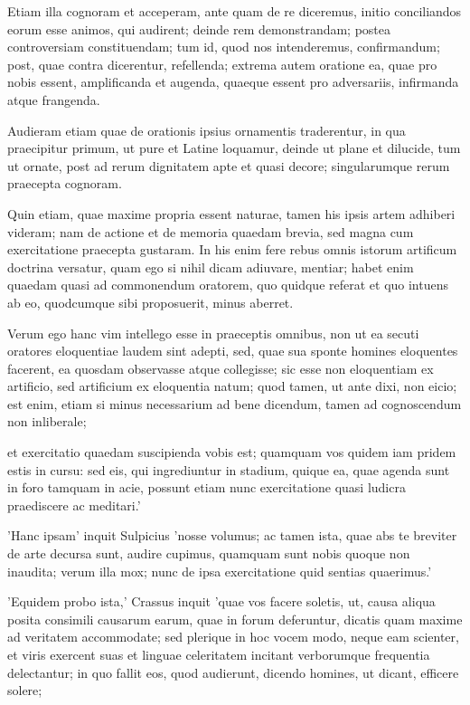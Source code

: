  Etiam illa cognoram et acceperam, ante quam de re diceremus, initio conciliandos eorum esse animos, qui audirent; deinde rem demonstrandam; postea controversiam constituendam; tum id, quod nos intenderemus, confirmandum; post, quae contra dicerentur, refellenda; extrema autem oratione ea, quae pro nobis essent, amplificanda et augenda, quaeque essent pro adversariis, infirmanda atque frangenda.

 Audieram etiam quae de orationis ipsius ornamentis traderentur, in qua praecipitur primum, ut pure et Latine loquamur, deinde ut plane et dilucide, tum ut ornate, post ad rerum dignitatem apte et quasi decore; singularumque rerum praecepta cognoram.

 Quin etiam, quae maxime propria essent naturae, tamen his ipsis artem adhiberi videram; nam de actione et de memoria quaedam brevia, sed magna cum exercitatione praecepta gustaram. In his enim fere rebus omnis istorum artificum doctrina versatur, quam ego si nihil dicam adiuvare, mentiar; habet enim quaedam quasi ad commonendum oratorem, quo quidque referat et quo intuens ab eo, quodcumque sibi proposuerit, minus aberret.

 Verum ego hanc vim intellego esse in praeceptis omnibus, non ut ea secuti oratores eloquentiae laudem sint adepti, sed, quae sua sponte homines eloquentes facerent, ea quosdam observasse atque collegisse; sic esse non eloquentiam ex artificio, sed artificium ex eloquentia natum; quod tamen, ut ante dixi, non eicio; est enim, etiam si minus necessarium ad bene dicendum, tamen ad cognoscendum non inliberale;

 et exercitatio quaedam suscipienda vobis est; quamquam vos quidem iam pridem estis in cursu: sed eis, qui ingrediuntur in stadium, quique ea, quae agenda sunt in foro tamquam in acie, possunt etiam nunc exercitatione quasi ludicra praediscere ac meditari.'

 'Hanc ipsam' inquit Sulpicius 'nosse volumus; ac tamen ista, quae abs te breviter de arte decursa sunt, audire cupimus, quamquam sunt nobis quoque non inaudita; verum illa mox; nunc de ipsa exercitatione quid sentias quaerimus.'

 'Equidem probo ista,' Crassus inquit 'quae vos facere soletis, ut, causa aliqua posita consimili causarum earum, quae in forum deferuntur, dicatis quam maxime ad veritatem accommodate; sed plerique in hoc vocem modo, neque eam scienter, et viris exercent suas et linguae celeritatem incitant verborumque frequentia delectantur; in quo fallit eos, quod audierunt, dicendo homines, ut dicant, efficere solere;

